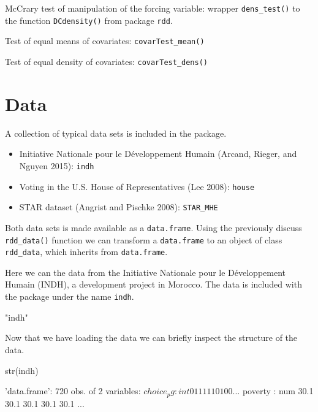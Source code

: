 \documentclass[article]{jss}
\begin{document}
McCrary test of manipulation of the forcing variable: wrapper
\texttt{dens\_test()} to the function \texttt{DCdensity()} from package
\texttt{rdd}.

Test of equal means of covariates: \texttt{covarTest\_mean()}

Test of equal density of covariates: \texttt{covarTest\_dens()}

\section{Data}\label{data}

A collection of typical data sets is included in the package.

\begin{itemize}
\itemsep1pt\parskip0pt
\item
  Initiative Nationale pour le Développement Humain (Arcand, Rieger, and
  Nguyen 2015): \texttt{indh}
\item
  Voting in the U.S. House of Representatives (Lee 2008): \texttt{house}
\item
  STAR dataset (Angrist and Pischke 2008): \texttt{STAR\_MHE}
\end{itemize}

Both data sets is made available as a \texttt{data.frame}. Using the
previously discuss \texttt{rdd\_data()} function we can transform a
\texttt{data.frame} to an object of class \texttt{rdd\_data}, which
inherits from \texttt{data.frame}.

Here we can the data from the Initiative Nationale pour le Développement
Humain (INDH), a development project in Morocco. The data is included
with the package under the name \texttt{indh}.

\begin{CodeChunk}
\begin{CodeOutput}
[1] "indh"
\end{CodeOutput}
\end{CodeChunk}

Now that we have loading the data we can briefly inspect the structure
of the data.

\begin{CodeChunk}
\begin{CodeInput}
str(indh)
\end{CodeInput}
\begin{CodeOutput}
'data.frame':   720 obs. of  2 variables:
 $ choice_pg: int  0 1 1 1 1 1 0 1 0 0 ...
 $ poverty  : num  30.1 30.1 30.1 30.1 30.1 ...
\end{CodeOutput}
\end{CodeChunk}
\end{document}
